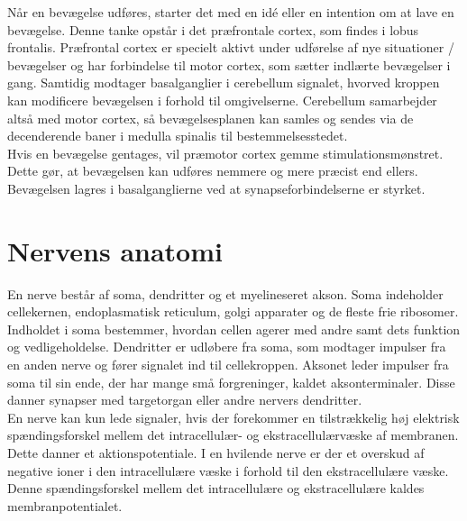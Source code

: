 Når en bevægelse udføres, starter det med en idé eller en intention om at lave en bevægelse. Denne tanke opstår i det præfrontale cortex, som findes i lobus frontalis. Præfrontal cortex er specielt aktivt under udførelse af nye situationer / bevægelser og har forbindelse til motor cortex, som sætter indlærte bevægelser i gang. Samtidig modtager basalganglier i cerebellum signalet, hvorved kroppen kan modificere bevægelsen i forhold til omgivelserne. Cerebellum samarbejder altså med motor cortex, så bevægelsesplanen kan samles og sendes via de decenderende baner i medulla spinalis til bestemmelsesstedet. \cite{Bojsen-Moeller2012} \\
Hvis en bevægelse gentages, vil præmotor cortex gemme stimulationsmønstret. Dette gør, at bevægelsen kan udføres nemmere og mere præcist end ellers. Bevægelsen lagres i basalganglierne ved at synapseforbindelserne er styrket. \cite{Martini2012}

\section{Nervens anatomi}
En nerve består af soma, dendritter og et myelineseret akson. Soma indeholder cellekernen, endoplasmatisk reticulum, golgi apparater og de fleste frie ribosomer. Indholdet i soma bestemmer, hvordan cellen agerer med andre samt dets funktion og vedligeholdelse. Dendritter er udløbere fra soma, som modtager impulser fra en anden nerve og fører signalet ind til cellekroppen. Aksonet leder impulser fra soma til sin ende, der har mange små forgreninger, kaldet aksonterminaler. Disse danner synapser med targetorgan eller andre nervers dendritter. \cite{Stanfield2014} \\
En nerve kan kun lede signaler, hvis der forekommer en tilstrækkelig høj elektrisk spændingsforskel mellem det intracellulær- og ekstracellulærvæske af membranen. Dette danner et aktionspotentiale. I en hvilende nerve er der et overskud af negative ioner i den intracellulære væske i forhold til den ekstracellulære væske. Denne spændingsforskel mellem det intracellulære og ekstracellulære kaldes membranpotentialet. \cite{Martini2012,Stanfield2014}

